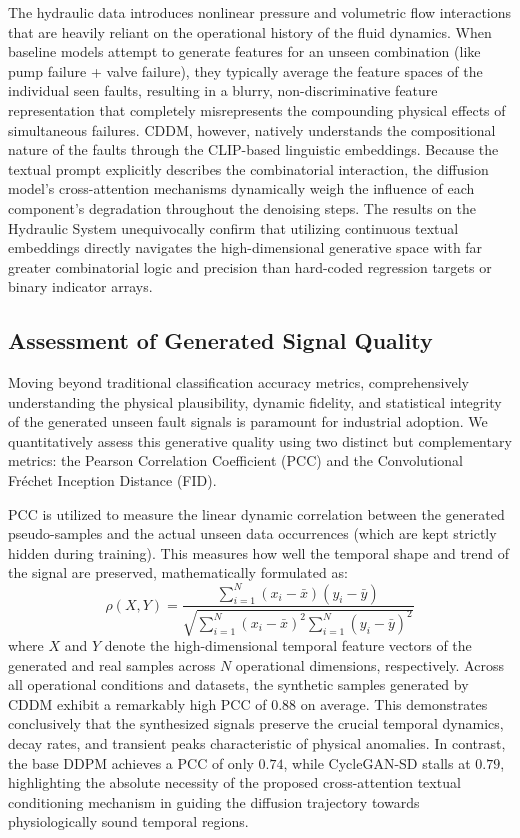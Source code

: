 The hydraulic data introduces nonlinear pressure and volumetric flow interactions that are heavily reliant on the operational history of the fluid dynamics. When baseline models attempt to generate features for an unseen combination (like pump failure + valve failure), they typically average the feature spaces of the individual seen faults, resulting in a blurry, non-discriminative feature representation that completely misrepresents the compounding physical effects of simultaneous failures. CDDM, however, natively understands the compositional nature of the faults through the CLIP-based linguistic embeddings. Because the textual prompt explicitly describes the combinatorial interaction, the diffusion model’s cross-attention mechanisms dynamically weigh the influence of each component's degradation throughout the denoising steps. The results on the Hydraulic System unequivocally confirm that utilizing continuous textual embeddings directly navigates the high-dimensional generative space with far greater combinatorial logic and precision than hard-coded regression targets or binary indicator arrays.

\subsection{Assessment of Generated Signal Quality}
\label{subsec:signal_quality}

Moving beyond traditional classification accuracy metrics, comprehensively understanding the physical plausibility, dynamic fidelity, and statistical integrity of the generated unseen fault signals is paramount for industrial adoption. We quantitatively assess this generative quality using two distinct but complementary metrics: the Pearson Correlation Coefficient (PCC) and the Convolutional Fréchet Inception Distance (FID). 

PCC is utilized to measure the linear dynamic correlation between the generated pseudo-samples and the actual unseen data occurrences (which are kept strictly hidden during training). This measures how well the temporal shape and trend of the signal are preserved, mathematically formulated as:
\begin{equation}
    \label{eq:pcc}
    \rho(X, Y) = \frac{\sum_{i=1}^{N}(x_i - \bar{x})(y_i - \bar{y})}{\sqrt{\sum_{i=1}^{N}(x_i - \bar{x})^2 \sum_{i=1}^{N}(y_i - \bar{y})^2}}
\end{equation}
where $X$ and $Y$ denote the high-dimensional temporal feature vectors of the generated and real samples across $N$ operational dimensions, respectively. Across all operational conditions and datasets, the synthetic samples generated by CDDM exhibit a remarkably high PCC of $0.88$ on average. This demonstrates conclusively that the synthesized signals preserve the crucial temporal dynamics, decay rates, and transient peaks characteristic of physical anomalies. In contrast, the base DDPM achieves a PCC of only $0.74$, while CycleGAN-SD stalls at $0.79$, highlighting the absolute necessity of the proposed cross-attention textual conditioning mechanism in guiding the diffusion trajectory towards physiologically sound temporal regions.

